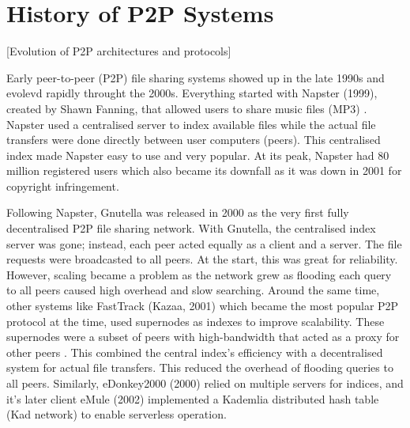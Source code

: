 \documentclass[12pt,a4paper]{report}
\begin{document}
\section{History of P2P Systems}
 [Evolution of P2P architectures and protocols]


Early peer-to-peer (P2P) file sharing systems showed up in the late 1990s and evolevd rapidly throught the 2000s. Everything started with Napster (1999), created by Shawn Fanning, that allowed users to share music files (MP3) \cite{wikipedia-p2p}. Napster used a centralised server to index available files while the actual file transfers were done directly between user computers (peers). This centralised index made Napster easy to use and very popular. At its peak, Napster had 80 million registered users \cite{wikipedia-napster} which also became its downfall as it was down in 2001 for copyright infringement.

Following Napster, Gnutella was released in 2000 as the very first fully decentralised P2P file sharing network. With Gnutella, the centralised index server was gone; instead, each peer acted equally as a client and a server. The file requests were broadcasted to all peers. At the start, this was great for reliability. However, scaling became a problem as the network grew as flooding each query to all peers caused high overhead and slow searching. Around the same time, other systems like FastTrack (Kazaa, 2001) which became the most popular P2P protocol at the time, used supernodes as indexes to improve scalability. These supernodes were a subset of peers with high-bandwidth that acted as a proxy for other peers \cite{wikipedia-fasttrack}. This combined the central index's efficiency with a decentralised system for actual file transfers. This reduced the overhead of flooding queries to all peers. Similarly, eDonkey2000 (2000) relied on multiple servers for indices, and it's later client eMule (2002) implemented a Kademlia distributed hash table (Kad network) to enable serverless operation.
\end{document}
